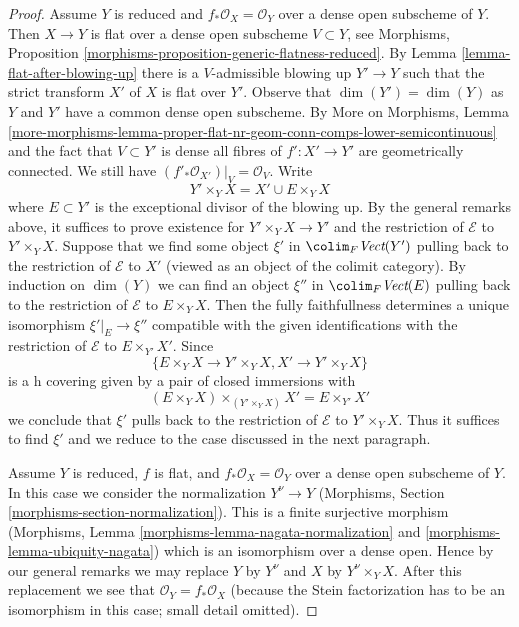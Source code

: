 \begin{proof}
\medskip\noindent
Assume $Y$ is reduced and $f_*\mathcal{O}_X = \mathcal{O}_Y$
over a dense open subscheme of $Y$.
Then $X \to Y$ is flat over a dense open
subscheme $V \subset Y$, see
Morphisms, Proposition \ref{morphisms-proposition-generic-flatness-reduced}.
By Lemma \ref{lemma-flat-after-blowing-up}
there is a $V$-admissible blowing up $Y' \to Y$ such that
the strict transform $X'$ of $X$ is flat over $Y'$.
Observe that $\dim(Y') = \dim(Y)$ as $Y$ and $Y'$ have
a common dense open subscheme. By More on Morphisms, Lemma
\ref{more-morphisms-lemma-proper-flat-nr-geom-conn-comps-lower-semicontinuous}
and the fact that $V \subset Y'$ is dense
all fibres of $f' : X' \to Y'$ are geometrically connected.
We still have $(f'_*\mathcal{O}_{X'})|_V = \mathcal{O}_V$.
Write
$$
Y' \times_Y X = X' \cup E \times_Y X
$$
where $E \subset Y'$ is the exceptional divisor of the blowing up.
By the general remarks above, it suffices to prove existence
for $Y' \times_Y X \to Y'$ and the restriction of $\mathcal{E}$
to $Y' \times_Y X$.
Suppose that we find some object $\xi'$ in $\colim_F \textit{Vect}(Y')$
pulling back to the restriction of $\mathcal{E}$ to $X'$ (viewed
as an object of the colimit category).
By induction on $\dim(Y)$ we can find an object $\xi''$ in
$\colim_F \textit{Vect}(E)$ pulling back to the restriction of
$\mathcal{E}$ to $E \times_Y X$. Then the fully faithfullness
determines a unique isomorphism $\xi'|_E \to \xi''$
compatible with the given identifications with the restriction
of $\mathcal{E}$ to $E \times_{Y'} X'$. Since
$$
\{E \times_Y X \to Y' \times_Y X, X' \to Y' \times_Y X\}
$$
is a h covering given by a pair of closed immersions with
$$
(E \times_Y X) \times_{(Y' \times_Y X)} X' = E \times_{Y'} X'
$$
we conclude that $\xi'$ pulls back to the restriction of
$\mathcal{E}$ to $Y' \times_Y X$. Thus it suffices to find
$\xi'$ and we reduce to the case discussed in the next paragraph.

\medskip\noindent
Assume $Y$ is reduced, $f$ is flat, and $f_*\mathcal{O}_X = \mathcal{O}_Y$
over a dense open subscheme of $Y$. In this case we consider the
normalization $Y^\nu \to Y$ (Morphisms, Section
\ref{morphisms-section-normalization}). This is a finite surjective
morphism
(Morphisms, Lemma \ref{morphisms-lemma-nagata-normalization} and
\ref{morphisms-lemma-ubiquity-nagata}) which is an isomorphism
over a dense open. Hence by our general remarks we may
replace $Y$ by $Y^\nu$ and $X$ by $Y^\nu \times_Y X$.
After this replacement we see that $\mathcal{O}_Y = f_*\mathcal{O}_X$
(because the Stein factorization has to be an isomorphism
in this case; small detail omitted).


\end{proof}
